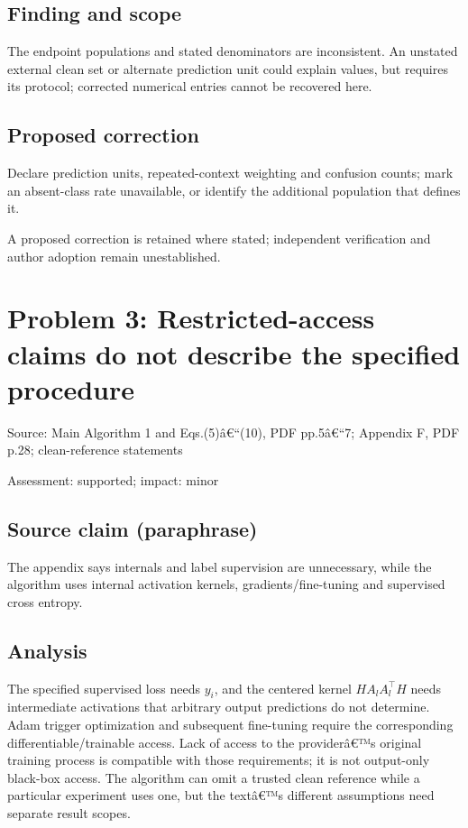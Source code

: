 \documentclass[11pt]{article}
\begin{document}
\subsection*{Finding and scope}

The endpoint populations and stated denominators are inconsistent. An unstated external clean set or alternate prediction unit could explain values, but requires its protocol; corrected numerical entries cannot be recovered here.

\subsection*{Proposed correction}

Declare prediction units, repeated-context weighting and confusion counts; mark an absent-class rate unavailable, or identify the additional population that defines it.

A proposed correction is retained where stated; independent verification and author adoption remain unestablished.

\section*{Problem 3: Restricted-access claims do not describe the specified procedure}

Source: Main Algorithm 1 and Eqs.(5)â€“(10), PDF pp.5â€“7; Appendix F, PDF p.28; clean-reference statements

Assessment: supported; impact: minor

\subsection*{Source claim (paraphrase)}

The appendix says internals and label supervision are unnecessary, while the algorithm uses internal activation kernels, gradients/fine-tuning and supervised cross entropy.

\subsection*{Analysis}

The specified supervised loss needs \(y_i\), and the centered kernel \(H A_lA_l^\top H\) needs intermediate activations that arbitrary output predictions do not determine. Adam trigger optimization and subsequent fine-tuning require the corresponding differentiable/trainable access. Lack of access to the providerâ€™s original training process is compatible with those requirements; it is not output-only black-box access. The algorithm can omit a trusted clean reference while a particular experiment uses one, but the textâ€™s different assumptions need separate result scopes.
\end{document}
